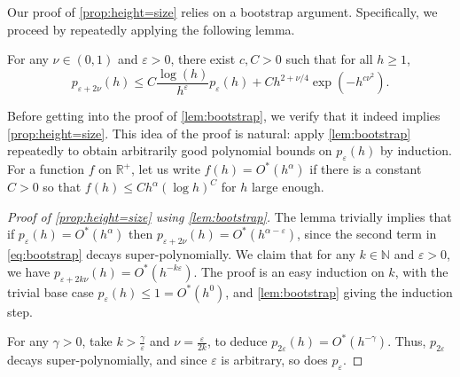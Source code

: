 \documentclass[11pt,reqno]{amsart}
\newcommand{\N}{\mathbb{N}}
\newcommand{\R}{\mathbb{R}}
\newcommand{\1}{\mathbf{1}}
\newcommand{\0}{\mathbf{0}}
\newcommand{\eps}{\varepsilon}
\begin{document}
Our proof of \cref{prop:height=size} relies on a bootstrap argument.
Specifically, we proceed by repeatedly applying the following lemma.

\begin{lem}\label{lem:bootstrap}
  For any $\nu \in (0,1)$ and $\varepsilon > 0$, there exist $c, C > 0$ such that for all $h\geq 1$,
  \begin{equation}\label{eq:bootstrap}
    p_{\varepsilon + 2\nu}(h) \leq C\frac{\log(h)}{h^{\varepsilon}}p_{\varepsilon}(h) + Ch^{2+\nu/4}\exp(-h^{c\nu^2}).
  \end{equation}
\end{lem}

Before getting into the proof of \cref{lem:bootstrap}, we verify that it indeed implies \cref{prop:height=size}.
This idea of the proof is natural: apply \cref{lem:bootstrap} repeatedly to obtain arbitrarily good polynomial bounds on $p_\eps(h)$ by induction.
For a function $f$ on $\R^+$, let us write $f(h)=O^*(h^\alpha)$ if there is a constant $C>0$ so that $f(h) \leq C h^\alpha (\log h)^{C}$ for $h$ large enough.

\begin{proof}[Proof of \cref{prop:height=size} using \cref{lem:bootstrap}]
  The lemma trivially implies that if $p_\eps(h) = O^*(h^\alpha)$ then $p_{\eps+2\nu}(h) = O^*(h^{\alpha-\eps})$, since the second term in \eqref{eq:bootstrap} decays super-polynomially.
  We claim that for any $k\in\N$ and $\eps>0$, we have $p_{\eps+2k\nu}(h) = O^*(h^{-k\eps})$.
  The proof is an easy induction on $k$, with the trivial base case $p_\eps(h)\leq 1 = O^*(h^0)$, and \cref{lem:bootstrap} giving the induction step.

  For any $\gamma>0$, take $k > \frac{\gamma}{\eps}$ and $\nu=\frac{\eps}{2k}$, to deduce $p_{2\eps}(h) = O^*(h^{-\gamma})$.
  Thus, $p_{2\eps}$ decays super-polynomially, and since $\eps$ is arbitrary, so does $p_\eps$.
\end{proof}
\end{document}
